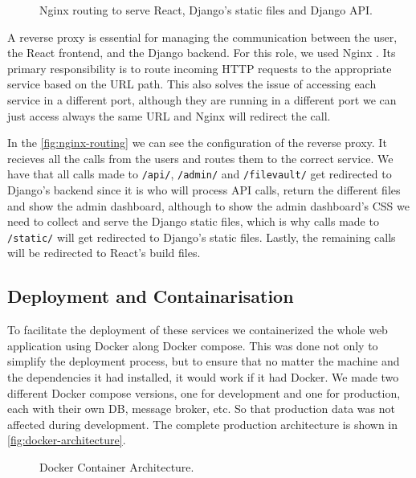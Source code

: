 \begin{figure}[htbp]
    \centering
    
    \caption{Nginx routing to serve React, Django's static files and Django API.}
    \label{fig:nginx-routing}
\end{figure}

A reverse proxy is essential for managing the communication between
the user, the React frontend, and the Django backend.
For this role, we used Nginx \autocite{Nginx}.
Its primary responsibility is to route incoming HTTP requests to the appropriate service based on the URL path.
This also solves the issue of accessing each service in a different port,
although they are running in a different port
we can just access always the same URL and Nginx will redirect the call.

In the \autoref{fig:nginx-routing}
we can see the configuration of the reverse proxy.
It recieves all the calls from the users and routes them to the correct service.
We have that all calls made to \texttt{/api/}, \texttt{/admin/} and \texttt{/filevault/}
get redirected to Django's backend since it is who will process \ac{API} calls,
return the different files and show the admin dashboard,
although to show the admin dashboard's CSS
we need to collect and serve the Django static files,
which is why calls made to \texttt{/static/} will get redirected to Django's static files.
Lastly, the remaining calls will be redirected to React's build files.

\subsection{Deployment and Containarisation}



To facilitate the deployment of these services
we containerized the whole web application using Docker \autocite{merkelDockerLightweightLinux2014} along Docker compose.
This was done not only to simplify the deployment process,
but to ensure that no matter the machine and the dependencies it had installed,
it would work if it had Docker.
We made two different Docker compose versions, one for development and one for production,
each with their own \ac{DB}, message broker, etc. So that production data was not affected during development.
The complete production architecture is shown in \autoref{fig:docker-architecture}.

\begin{figure}[!htbp]
    \centering
    
    \caption{Docker Container Architecture.}
    \label{fig:docker-architecture}
\end{figure}

